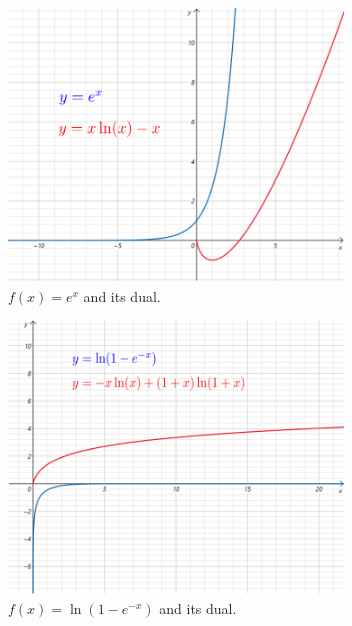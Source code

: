 \begin{figure}[h!]
\centering
\includegraphics[width=3.5in]
{var-bay-medical/dual-ex.png}
\caption{$f(x)=e^x$ and its dual.}
\label{fig-dual-ex}
\end{figure}

\begin{figure}[h!]
\centering
\includegraphics[width=3.5in]
{var-bay-medical/dual-ln-1-e-x.png}
\caption{$f(x)=\ln(1-e^{-x})$ and its dual.}
\label{fig-dual-dual-ln-1-e-x}
\end{figure}



